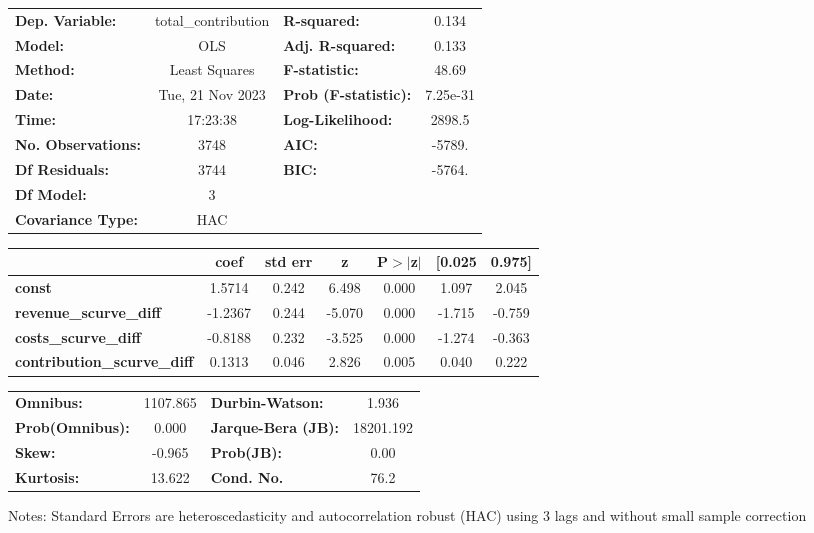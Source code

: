 \begin{center}
\begin{tabular}{lclc}
\toprule
\textbf{Dep. Variable:}             & total\_contribution & \textbf{  R-squared:         } &     0.134   \\
\textbf{Model:}                     &         OLS         & \textbf{  Adj. R-squared:    } &     0.133   \\
\textbf{Method:}                    &    Least Squares    & \textbf{  F-statistic:       } &     48.69   \\
\textbf{Date:}                      &   Tue, 21 Nov 2023  & \textbf{  Prob (F-statistic):} &  7.25e-31   \\
\textbf{Time:}                      &       17:23:38      & \textbf{  Log-Likelihood:    } &    2898.5   \\
\textbf{No. Observations:}          &          3748       & \textbf{  AIC:               } &    -5789.   \\
\textbf{Df Residuals:}              &          3744       & \textbf{  BIC:               } &    -5764.   \\
\textbf{Df Model:}                  &             3       & \textbf{                     } &             \\
\textbf{Covariance Type:}           &         HAC         & \textbf{                     } &             \\
\bottomrule
\end{tabular}
\begin{tabular}{lcccccc}
                                    & \textbf{coef} & \textbf{std err} & \textbf{z} & \textbf{P$> |$z$|$} & \textbf{[0.025} & \textbf{0.975]}  \\
\midrule
\textbf{const}                      &       1.5714  &        0.242     &     6.498  &         0.000        &        1.097    &        2.045     \\
\textbf{revenue\_scurve\_diff}      &      -1.2367  &        0.244     &    -5.070  &         0.000        &       -1.715    &       -0.759     \\
\textbf{costs\_scurve\_diff}        &      -0.8188  &        0.232     &    -3.525  &         0.000        &       -1.274    &       -0.363     \\
\textbf{contribution\_scurve\_diff} &       0.1313  &        0.046     &     2.826  &         0.005        &        0.040    &        0.222     \\
\bottomrule
\end{tabular}
\begin{tabular}{lclc}
\textbf{Omnibus:}       & 1107.865 & \textbf{  Durbin-Watson:     } &     1.936  \\
\textbf{Prob(Omnibus):} &   0.000  & \textbf{  Jarque-Bera (JB):  } & 18201.192  \\
\textbf{Skew:}          &  -0.965  & \textbf{  Prob(JB):          } &      0.00  \\
\textbf{Kurtosis:}      &  13.622  & \textbf{  Cond. No.          } &      76.2  \\
\bottomrule
\end{tabular}
\end{center}

Notes: \newline
 [1] Standard Errors are heteroscedasticity and autocorrelation robust (HAC) using 3 lags and without small sample correction
